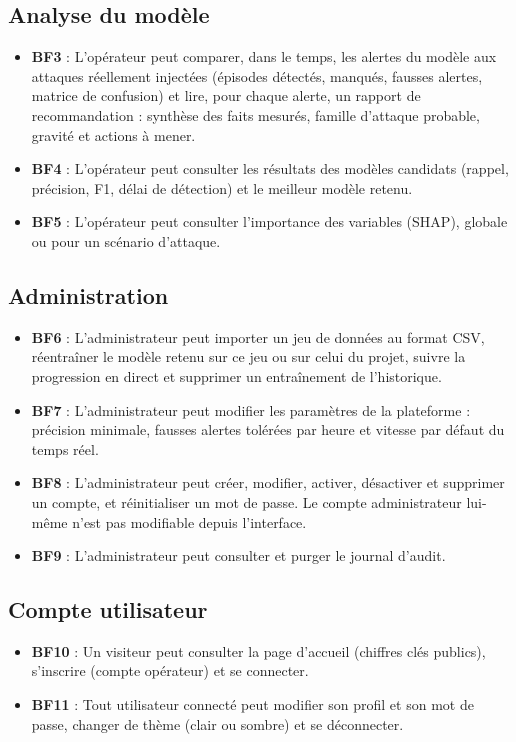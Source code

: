 \subsection*{Analyse du modèle}
\begin{itemize}
  \item \textbf{BF3} : L'opérateur peut comparer, dans le temps, les alertes du
        modèle aux attaques réellement injectées (épisodes détectés, manqués,
        fausses alertes, matrice de confusion) et lire, pour chaque alerte, un
        rapport de recommandation : synthèse des faits mesurés, famille
        d'attaque probable, gravité et actions à mener.
  \item \textbf{BF4} : L'opérateur peut consulter les résultats des modèles
        candidats (rappel, précision, F1, délai de détection) et le meilleur
        modèle retenu.
  \item \textbf{BF5} : L'opérateur peut consulter l'importance des variables
        (SHAP), globale ou pour un scénario d'attaque.
\end{itemize}

\subsection*{Administration}
\begin{itemize}
  \item \textbf{BF6} : L'administrateur peut importer un jeu de données au
        format CSV, réentraîner le modèle retenu sur ce jeu ou sur celui du
        projet, suivre la progression en direct et supprimer un entraînement
        de l'historique.
  \item \textbf{BF7} : L'administrateur peut modifier les paramètres de la
        plateforme : précision minimale, fausses alertes tolérées par heure et
        vitesse par défaut du temps réel.
  \item \textbf{BF8} : L'administrateur peut créer, modifier, activer,
        désactiver et supprimer un compte, et réinitialiser un mot de passe.
        Le compte administrateur lui-même n'est pas modifiable depuis
        l'interface.
  \item \textbf{BF9} : L'administrateur peut consulter et purger le journal
        d'audit.
\end{itemize}

\subsection*{Compte utilisateur}
\begin{itemize}
  \item \textbf{BF10} : Un visiteur peut consulter la page d'accueil (chiffres
        clés publics), s'inscrire (compte opérateur) et se connecter.
  \item \textbf{BF11} : Tout utilisateur connecté peut modifier son profil et
        son mot de passe, changer de thème (clair ou sombre) et se déconnecter.
\end{itemize}

